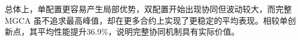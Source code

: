总体上，单配置更容易产生局部优势，双配置开始出现协同但波动较大，而完整 MGCA 虽不追求最高峰值，却在更多合约上实现了更稳定的平均表现。相较单创新点，其平均性能提升36.9\%，说明完整协同机制具有实际价值。



